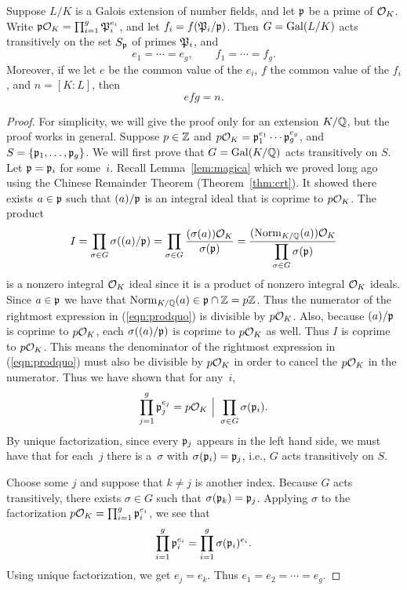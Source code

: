 \begin{theorem}\label{thm:transitive}
	Suppose $L/K$ is a Galois extension of number fields,
	and let $\p$ be a prime of $\O_K$. 
	Write $\p\O_K = \prod_{i=1}^g \P_i^{e_i}$, and let $f_i = f(\P_i/\p)$.
	Then $G = \Gal(L/K)$ acts transitively on the set $S_\p$ of primes $\P_i$,
	and
	$$
		e_1 = \cdots = e_g, \qquad f_1 = \cdots = f_g.
	$$
	Moreover, if we let $e$ be the common value of the $e_i$,
	$f$ the common value of the $f_i$, and $n = [K:L]$, then
	$$
		efg = n.
	$$
\end{theorem}
\begin{proof}
	For simplicity, we will give the proof only for an extension $K/\Q$, but
	the proof works in general. Suppose $p\in\Z$ and
	$p\O_K=\p_1^{e_1}\cdots \p_g^{e_g}$, and $S=\{\p_1,\ldots, \p_g\}$.  We
	will first prove that $G = \Gal(K/\Q)$ acts transitively on $S$. 
	Let $\p=\p_i$ for some~$i$.
	Recall Lemma~\ref{lem:magica} which we proved long ago using the
	Chinese Remainder Theorem (Theorem~\ref{thm:crt}). It showed there exists
	$a\in\p$ such that $(a)/\p$ is an integral ideal that is
	coprime to $p\O_K$.   The product
	\begin{equation}\label{eqn:prodquo}
		I= \prod_{\sigma\in G} \sigma((a)/\p)
		= \prod_{\sigma\in G} \frac{(\sigma(a))\O_K}{\sigma(\p)}
		= \frac{(\Norm_{K/\Q}(a))\O_K}{\displaystyle \prod_{\sigma\in G} \sigma(\p)}
	\end{equation}
	is a nonzero integral $\O_K$ ideal since it is a product of nonzero
	integral $\O_K$ ideals.
	Since $a\in \p$ we have that
	$\Norm_{K/\Q}(a) \in \p\cap\Z=p\Z$.  Thus the numerator of
	the rightmost expression in (\ref{eqn:prodquo}) is
	divisible by $p\O_K$.   Also, because $(a)/\p$ is coprime
	to $p\O_K$, each $\sigma((a)/\p)$ is coprime to $p\O_K$
	as well.   Thus $I$ is coprime to $p\O_K$.   This means the
	denominator of the rightmost expression in (\ref{eqn:prodquo})
	must also be divisible by $p\O_K$ in order to cancel the $p\O_K$
	in the numerator.  Thus we have shown that for any~$i$,
	$$
		\prod_{j=1}^g \p_j^{e_j}
		= p\O_K \,\,\Big|\,\, \prod_{\sigma\in G} \sigma(\p_i).
	$$
	By unique factorization, since every $\p_j$ appears in the left hand
	side, we must have that for each~$j$ there is a~$\sigma$ with
	$\sigma(\p_i)=\p_j$, i.e., $G$ acts transitively on $S$.

	Choose some $j$ and suppose that $k\neq j$ is another index.  Because
	$G$ acts transitively, there exists $\sigma\in G$ such that
	$\sigma(\p_k)=\p_j$.  Applying $\sigma$ to the factorization $p\O_K =
	\prod_{i=1}^g \p_i^{e_i}$, we see that
	$$
		\prod_{i=1}^g \p_i^{e_i} = \prod_{i=1}^g \sigma(\p_i)^{e_i}.
	$$
	Using unique factorization,
	we get $e_j = e_k$.  Thus $e_1=e_2=\cdots = e_g$.


\end{proof}
